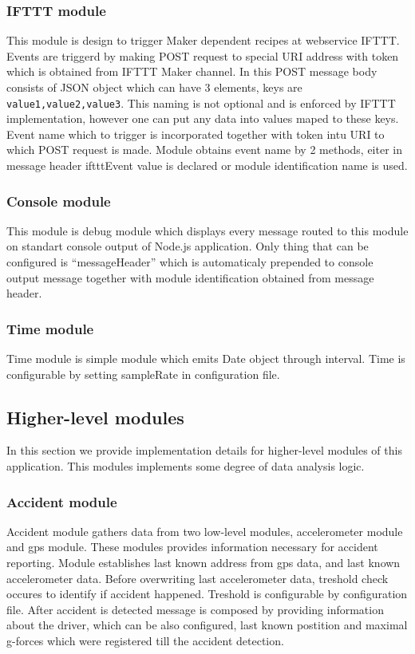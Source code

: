 \subsubsection{IFTTT module} %
\label{ssub:ifttt_module}
This module is design to trigger Maker dependent recipes at webservice IFTTT. Events are triggerd by making POST request to special URI address with token which is obtained from IFTTT Maker channel. In this POST message body consists of JSON object which can have 3 elements, keys are \verb|value1,value2,value3|. This naming is not optional and is enforced by IFTTT implementation, however one can put any data into values maped to these keys. Event name which to trigger is incorporated together with token intu URI to which POST request is made. Module obtains event name by 2 methods, eiter in message header iftttEvent value is declared or module identification name is used.
\subsubsection{Console module} %
\label{ssub:console_module}
This module is debug module which displays every message routed to this module on standart console output of Node.js application. Only thing that can be configured is ``messageHeader'' which is automaticaly prepended to console output message together with module identification obtained from message header.
\subsubsection{Time module} %
\label{ssub:time_module}
Time module is simple module which emits Date object through interval. Time is configurable by setting sampleRate in configuration file.
\subsection{Higher-level modules} %
\label{sub:higher_level_modules}
In this section we provide implementation details for higher-level modules of this application. This modules implements some degree of data analysis logic.
\subsubsection{Accident module} %
\label{ssub:accident_module}
Accident module gathers data from two low-level modules, accelerometer module and gps module. These modules provides information necessary for accident reporting. Module establishes last known address from gps data, and last known accelerometer data. Before overwriting last accelerometer data, treshold check occures to identify if accident happened. Treshold is configurable by configuration file. After accident is detected message is composed by providing information about the driver, which can be also configured, last known postition and maximal g-forces which were registered till the accident detection.
